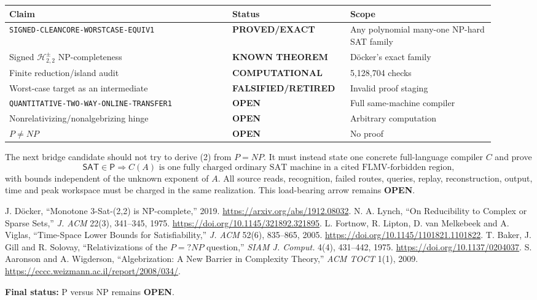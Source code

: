 \documentclass[11pt]{article}
\newcommand{\SAT}{\mathsf{SAT}}
\newcommand{\Hsigned}{\mathcal H^{\pm}_{2,2}}
\newcommand{\EXACT}{\textbf{PROVED/EXACT}}
\newcommand{\KNOWN}{\textbf{KNOWN THEOREM}}
\newcommand{\COMP}{\textbf{COMPUTATIONAL}}
\newcommand{\OPEN}{\textbf{OPEN}}
\newcommand{\RETIRED}{\textbf{FALSIFIED/RETIRED}}
\begin{document}
\begin{center}\scriptsize
\begin{tabular}{@{}p{0.43\linewidth}p{0.20\linewidth}p{0.29\linewidth}@{}}
\toprule
Claim & Status & Scope\\ \midrule
\texttt{SIGNED-CLEANCORE-WORSTCASE-EQUIV1} & \EXACT & Any polynomial many-one NP-hard SAT family\\
Signed $\Hsigned$ NP-completeness & \KNOWN & D\"ocker's exact family\\
Finite reduction/island audit & \COMP & 5,128,704 checks\\
Worst-case target as an intermediate & \RETIRED & Invalid proof staging\\
\texttt{QUANTITATIVE-TWO-WAY-ONLINE-TRANSFER1} & \OPEN & Full same-machine compiler\\
Nonrelativizing/nonalgebrizing hinge & \OPEN & Arbitrary computation\\
$P\ne NP$ & \OPEN & No proof\\
\bottomrule
\end{tabular}
\end{center}

The next bridge candidate should not try to derive (2) from $P=NP$.  It must
instead state one concrete full-language compiler $C$ and prove
\[
 \SAT\in\mathsf P
 \Longrightarrow C(A)\text{ is one fully charged ordinary SAT machine in a
 cited FLMV-forbidden region},
\]
with bounds independent of the unknown exponent of $A$.  All source reads,
recognition, failed routes, queries, replay, reconstruction, output, time and
peak workspace must be charged in the same realization.  This load-bearing
arrow remains \OPEN.

\begin{thebibliography}{9}
J. D\"ocker, ``Monotone 3-Sat-(2,2) is NP-complete,'' 2019.
\url{https://arxiv.org/abs/1912.08032}.
N. A. Lynch, ``On Reducibility to Complex or Sparse Sets,''
\emph{J. ACM} 22(3), 341--345, 1975.
\url{https://doi.org/10.1145/321892.321895}.
L. Fortnow, R. Lipton, D. van Melkebeek and A. Viglas,
``Time-Space Lower Bounds for Satisfiability,'' \emph{J. ACM} 52(6),
835--865, 2005. \url{https://doi.org/10.1145/1101821.1101822}.
T. Baker, J. Gill and R. Solovay, ``Relativizations of the $P=?NP$
question,'' \emph{SIAM J. Comput.} 4(4), 431--442, 1975.
\url{https://doi.org/10.1137/0204037}.
S. Aaronson and A. Wigderson, ``Algebrization: A New Barrier in Complexity
Theory,'' \emph{ACM TOCT} 1(1), 2009.
\url{https://eccc.weizmann.ac.il/report/2008/034/}.
\end{thebibliography}

\noindent\textbf{Final status:} P versus NP remains \OPEN.

\end{document}
